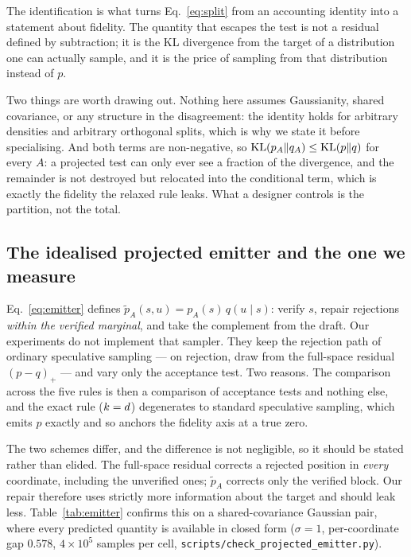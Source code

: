 The identification is what turns Eq.~\ref{eq:split} from an accounting identity into a statement
about fidelity. The quantity that escapes the test is not a residual defined by subtraction; it is
the KL divergence from the target of a distribution one can actually sample, and it is the price of
sampling from that distribution instead of $p$.

Two things are worth drawing out. Nothing here assumes Gaussianity, shared covariance, or any
structure in the disagreement: the identity holds for arbitrary densities and arbitrary orthogonal
splits, which is why we state it before specialising. And both terms are non-negative, so
$\operatorname{KL}(p_A \| q_A) \le \operatorname{KL}(p \| q)$ for every $A$: a projected test can only ever see a fraction of the
divergence, and the remainder is not destroyed but relocated into the conditional term, which is
exactly the fidelity the relaxed rule leaks. What a designer controls is the partition, not the
total.

\subsection{The idealised projected emitter and the one we measure}
\label{app:emitter}

Eq.~\ref{eq:emitter} defines $\tilde{p}_A(s,u) = p_A(s)\,q(u\mid s)$: verify $s$, repair rejections
\emph{within the verified marginal}, and take the complement from the draft. Our experiments do not
implement that sampler. They keep the rejection path of ordinary speculative sampling --- on
rejection, draw from the full-space residual $(p - q)_+$ --- and vary only the acceptance test. Two
reasons. The comparison across the five rules is then a comparison of acceptance tests and nothing
else, and the exact rule ($k = d$) degenerates to standard speculative sampling, which emits $p$
exactly and so anchors the fidelity axis at a true zero.

The two schemes differ, and the difference is not negligible, so it should be stated rather than
elided. The full-space residual corrects a rejected position in \emph{every} coordinate, including
the unverified ones; $\tilde{p}_A$ corrects only the verified block. Our repair therefore uses
strictly more information about the target and should leak less. Table~\ref{tab:emitter} confirms
this on a shared-covariance Gaussian pair, where every predicted quantity is available in closed
form ($\sigma = 1$, per-coordinate gap $0.578$, $4\times10^5$ samples per cell,
\texttt{scripts/check\_projected\_emitter.py}).

